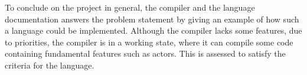 To conclude on the project in general, the compiler and the language documentation answers the problem statement by giving an example of how such a language could be implemented. Although the compiler lacks some features, due to priorities, the compiler is in a working state, where it can compile some code containing fundamental features such as actors. This is assessed to satisfy the criteria for the language.










